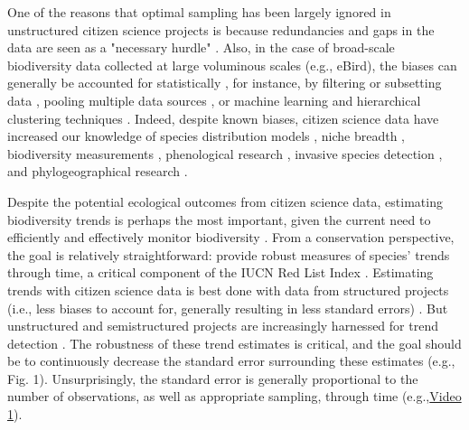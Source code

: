 \documentclass[9pt,twocolumn,twoside,lineno]{pnas-new}
\begin{document}
One of the reasons that optimal sampling has been largely ignored in unstructured citizen science projects is because redundancies and gaps in the data are seen as a "necessary hurdle" \cite{parrish2018exposing}. Also, in the case of broad-scale biodiversity data collected at large voluminous scales (e.g., eBird), the biases can generally be accounted for statistically \cite{isaac2014statistics, robinson2018correcting}, for instance, by filtering or subsetting data \cite{wiggins2011conservation}, pooling multiple data sources \cite{fithian2015bias}, or machine learning and hierarchical clustering techniques \cite{hochachka2012data, kelling2015taking}. Indeed, despite known biases, citizen science data have increased our knowledge of species distribution models \cite{bradsworth2017species, van2013opportunistic}, niche breadth \cite{tiago2017using}, biodiversity measurements \cite{stuart2017assessing, pocock2018vision}, phenological research \cite{la2014role, supp2015citizen}, invasive species detection \cite{pocock2017citizen, grason2018citizen}, and phylogeographical research \cite{bahls2014new, drury2019continent}. 

Despite the potential ecological outcomes from citizen science data, estimating biodiversity trends is perhaps the most important, given the current need to efficiently and effectively monitor biodiversity \cite{harrison2014assessing, honrado2016fostering, yoccoz2001monitoring}. From a conservation perspective, the goal is relatively straightforward: provide robust measures of species' trends through time, a critical component of the IUCN Red List Index \cite{baillie2008toward}. Estimating trends with citizen science data is best done with data from structured projects (i.e., less biases to account for, generally resulting in less standard errors) \cite{fox2011new}. But unstructured and semistructured projects are increasingly harnessed for trend detection \cite{walker2017using, kery2009trend, kery2010site, horns2018using, van2013occupancy, pagel2014quantifying}. The robustness of these trend estimates is critical, and the goal should be to continuously decrease the standard error surrounding these estimates (e.g., Fig. 1). Unsurprisingly, the standard error is generally proportional to the number of observations, as well as appropriate sampling, through time (e.g.,\href{https://github.com/coreytcallaghan/optimize_citizen_science_obs/blob/master/Figures/Noisy_miner_gif.gif}{Video 1}).
\end{document}

